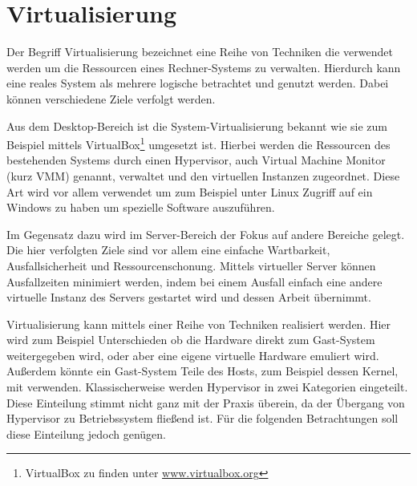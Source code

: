 \documentclass[
  a4paper,					    %
  twoside,
  DIV=calc,     				%
  bibliography=totoc,
  cleardoublepage=empty,
  ngerman,     					%
  final       					%
]{scrbook}
\begin{document}
\section{Virtualisierung}
\label{sec:Virtualisierung}
Der Begriff Virtualisierung bezeichnet eine Reihe von Techniken die verwendet werden um die Ressourcen eines Rechner-Systems zu verwalten. Hierdurch kann eine reales System als mehrere logische betrachtet und genutzt werden. Dabei können verschiedene Ziele verfolgt werden.

Aus dem Desktop-Bereich ist die System-Virtualisierung bekannt wie sie zum Beispiel mittels VirtualBox\footnote{VirtualBox zu finden unter \url{www.virtualbox.org}} umgesetzt ist. Hierbei werden die Ressourcen des bestehenden Systems durch einen Hypervisor, auch Virtual Machine Monitor (kurz VMM) genannt, verwaltet und den virtuellen Instanzen zugeordnet. Diese Art wird vor allem verwendet um zum Beispiel unter Linux Zugriff auf ein Windows zu haben um spezielle Software auszuführen.

Im Gegensatz dazu wird im Server-Bereich der Fokus auf andere Bereiche gelegt. Die hier verfolgten Ziele sind vor allem eine einfache Wartbarkeit, Ausfallsicherheit und Ressourcenschonung. Mittels virtueller Server können Ausfallzeiten minimiert werden, indem bei einem Ausfall einfach eine andere virtuelle Instanz des Servers gestartet wird und dessen Arbeit übernimmt. 

Virtualisierung kann mittels einer Reihe von Techniken realisiert werden. Hier wird zum Beispiel Unterschieden ob die Hardware direkt zum Gast-System weitergegeben wird, oder aber eine eigene virtuelle Hardware emuliert wird. Außerdem könnte ein Gast-System Teile des Hosts, zum Beispiel dessen Kernel, mit verwenden. Klassischerweise werden Hypervisor in zwei Kategorien eingeteilt\cite[Seite 22 ff.]{hypervisor}. Diese Einteilung stimmt nicht ganz mit der Praxis überein, da der Übergang von Hypervisor zu Betriebssystem fließend ist. Für die folgenden Betrachtungen soll diese Einteilung jedoch genügen.
\end{document}
